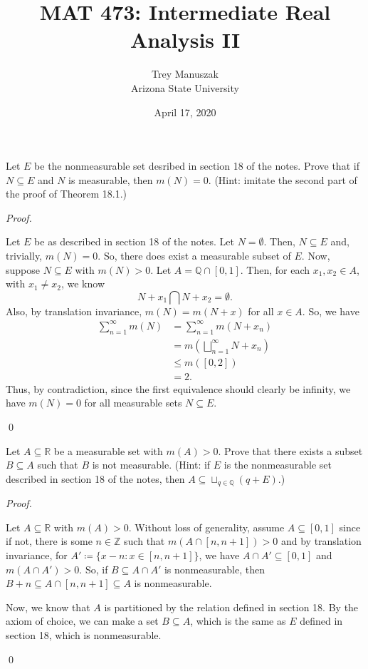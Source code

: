 \documentclass[12pt]{article}
\title{MAT 473: Intermediate Real Analysis II}
\date{April 17, 2020}
\author{Trey Manuszak\\ Arizona State University}
\newenvironment{problem}[2][Problem]{\begin{trivlist}
\item[\hskip \labelsep {\bfseries #1}\hskip \labelsep {\bfseries
#2.}]}{\end{trivlist}}
\newenvironment{sol}
    {\emph{Proof.}
    }
    {
    \qed
    }
\begin{document}


\maketitle
\newpage


\begin{problem}{41}
Let $E$ be the nonmeasurable set desribed in section 18 of the notes. Prove that if $N \subseteq E$ and $N$ is measurable, then $m(N) = 0$. (Hint: imitate the second part of the proof of Theorem 18.1.)
\end{problem}

\begin{sol}
  Let $E$ be as described in section 18 of the notes. Let $N = \emptyset$. Then, $N \subseteq E$ and, trivially, $m(N) = 0$. So, there does exist a measurable subset of $E$. Now, suppose $N \subseteq E$ with $m(N) > 0$. Let $A = \mathbb{Q} \cap [0,1]$. Then, for each $x_1,x_2 \in A$, with $x_1 \neq x_2$, we know $$N + x_1 \bigcap N + x_2 = \emptyset.$$ Also, by translation invariance, $m(N) = m(N+x)$ for all $x \in A$. So, we have 
  \begin{align*}
    \sum_{n = 1}^{\infty} m(N) &= \sum_{n = 1}^{\infty} m(N + x_n) \tag*{(Each $x_n \in A$)} \\
    &= m\left( \bigsqcup_{n = 1}^{\infty} N+x_n \right) \\
    &\leq m([0,2]) \\ &= 2.
  \end{align*}
  Thus, by contradiction, since the first equivalence should clearly be infinity, we have $m(N) = 0$ for all measurable sets $N \subseteq E$.
\end{sol}

\begin{problem}{42}
Let $A \subseteq \mathbb{R}$ be a measurable set with $m(A) > 0$. Prove that there exists a subset $B \subseteq A$ such that $B$ is not measurable. (Hint: if $E$ is the nonmeasurable set described in section 18 of the notes, then $A \subseteq \sqcup_{q \in \mathbb{Q}}(q+E)$.)
\end{problem}

\begin{sol}
  Let $A \subseteq \mathbb{R}$ with $m(A) > 0$. Without loss of generality, assume $A \subseteq [0,1]$ since if not, there is some $n \in \mathbb{Z}$ such that $m(A \cap [n,n+1]) > 0$ and by translation invariance, for $A' \coloneqq \{x-n : x \in [n,n+1]\}$, we have $A \cap A' \subseteq [0,1]$ and $m(A \cap A') > 0$. So, if $B \subseteq A \cap A'$ is nonmeasurable, then $B + n \subseteq A \cap [n,n+1] \subseteq A$ is nonmeasurable.

  Now, we know that $A$ is partitioned by the relation defined in section 18. By the axiom of choice, we can make a set $B \subseteq A$, which is the same as $E$ defined in section 18, which is nonmeasurable.
\end{sol}
\end{document}
